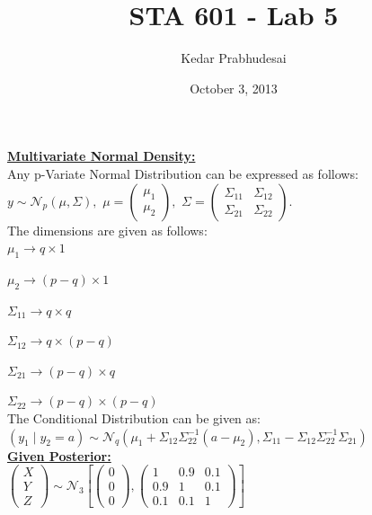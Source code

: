 \documentclass{article}
\title{STA 601 - Lab 5}
\author{Kedar Prabhudesai}
\date{October 3, 2013}
\begin{document}
\maketitle

{\Large\underline{\textbf{Multivariate Normal Density:}}}\\

Any p-Variate Normal Distribution can be expressed as follows:\\

$y \sim \mathcal{N}_p(\mu,\Sigma),$ $\mu = \left(\begin{matrix}\mu_1\\\mu_2\end{matrix}\right),$ $\Sigma = \left(\begin{matrix}\Sigma_{11}&\Sigma_{12}\\\Sigma_{21}&\Sigma_{22}\end{matrix}\right).$\\

The dimensions are given as follows:\\

$\mu_1 \rightarrow q \times 1$

$\mu_2 \rightarrow (p-q) \times 1$

$\Sigma_{11} \rightarrow q \times q$

$\Sigma_{12} \rightarrow q \times (p-q)$

$\Sigma_{21} \rightarrow (p-q) \times q$

$\Sigma_{22} \rightarrow (p-q) \times (p-q)$\\

The Conditional Distribution can be given as:\\

$(y_1 \mid y_2=a) \sim \mathcal{N}_q\left(\mu_1+\Sigma_{12}\Sigma_{22}^{-1}(a-\mu_2),\Sigma_{11}-\Sigma_{12}\Sigma_{22}^{-1}\Sigma_{21}\right)$\\

{\Large\underline{\textbf{Given Posterior:}}}\\

$\left(\begin{matrix}X\\Y\\Z\end{matrix}\right) \sim \mathcal{N}_3\left[\left(\begin{matrix}0\\0\\0\end{matrix}\right),\left(\begin{matrix}1&0.9&0.1\\0.9&1&0.1\\0.1&0.1&1\end{matrix}\right)\right]$\\
\end{document}
